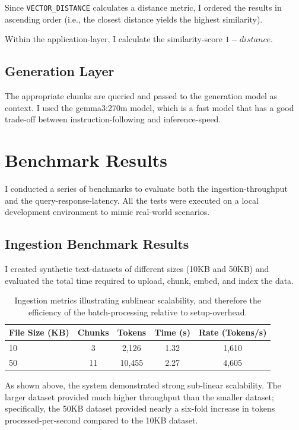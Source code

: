 \documentclass[11pt,a4paper]{article}
\begin{document}
Since \texttt{VECTOR\_DISTANCE} calculates a distance metric, I ordered the results in ascending order (i.e., the closest distance yields the highest similarity).

Within the application-layer, I calculate the similarity-score $1 - distance$.

\subsection{Generation Layer}

The appropriate chunks are queried and passed to the generation model as context. I used the gemma3:270m model, which is a fast model that has a good trade-off between instruction-following and inference-speed.

\section{Benchmark Results}

I conducted a series of benchmarks to evaluate both the ingestion-throughput and the query-response-latency. All the tests were executed on a local development environment to mimic real-world scenarios.

\subsection{Ingestion Benchmark Results}

I created synthetic text-datasets of different sizes (10KB and 50KB) and evaluated the total time required to upload, chunk, embed, and index the data.

\begin{table}[h]
\centering
\begin{tabular}{@{}lcccc@{}}
\toprule
\textbf{File Size (KB)} & \textbf{Chunks} & \textbf{Tokens} & \textbf{Time (s)} & \textbf{Rate (Tokens/s)} \\ \midrule
10 & 3 & 2,126 & 1.32 & 1,610 \\
50 & 11 & 10,455 & 2.27 & 4,605 \\ \bottomrule
\end{tabular}
\caption{Ingestion metrics illustrating sublinear scalability, and therefore the efficiency of the batch-processing relative to setup-overhead.}
\label{tab:ingestion}
\end{table}

As shown above, the system demonstrated strong sub-linear scalability. The larger dataset provided much higher throughput than the smaller dataset; specifically, the 50KB dataset provided nearly a six-fold increase in tokens processed-per-second compared to the 10KB dataset.
\end{document}
